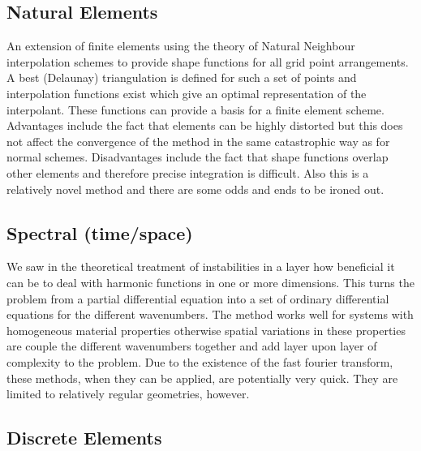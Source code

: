 \documentclass[10pt]{article}
\begin{document}
	\subsection{Natural Elements}
	
		An extension of finite elements using the theory of Natural
		Neighbour interpolation schemes to provide shape functions for
		all grid point arrangements. A best (Delaunay) triangulation is defined
		for such a set of points and interpolation functions exist which give
		an optimal representation of the interpolant. These functions can provide a basis
		for a finite element scheme. Advantages include the fact that elements
		can be highly distorted but this does not affect the convergence of the method
		in the same catastrophic way as for normal schemes. Disadvantages include
		the fact that shape functions overlap other elements and therefore precise
		integration is difficult. Also this is a relatively novel method and there are
		some odds and ends to be ironed out. 
	
	\subsection{Spectral (time/space)}
	
		We saw in the theoretical treatment of instabilities in a layer how
		beneficial it can be to deal with harmonic functions in one or more
		dimensions. This turns the problem from a partial differential equation
		into a set of ordinary differential equations for the different wavenumbers.
		The method works well for systems with homogeneous material properties
		otherwise spatial variations in these properties are couple the different 
		wavenumbers together and add layer upon layer of complexity to the 
		problem. Due to the existence of the fast fourier transform, these methods, when
		they can be applied, are potentially very quick. They are limited to relatively regular
		geometries, however.
	
	\subsection{Discrete Elements}
	
\end{document}
